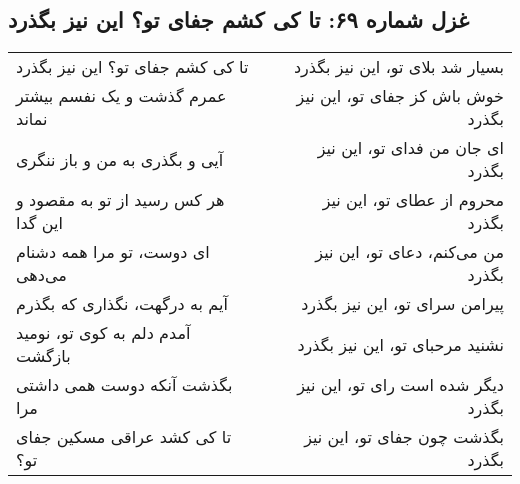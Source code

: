 \begin{center}
\section*{غزل شماره ۶۹: تا کی کشم جفای تو؟ این نیز بگذرد}
\label{sec:069}
\begin{longtable}{l p{0.5cm} r}
تا کی کشم جفای تو؟ این نیز بگذرد
&&
بسیار شد بلای تو، این نیز بگذرد
\\
عمرم گذشت و یک نفسم بیشتر نماند
&&
خوش باش کز جفای تو، این نیز بگذرد
\\
آیی و بگذری به من و باز ننگری
&&
ای جان من فدای تو، این نیز بگذرد
\\
هر کس رسید از تو به مقصود و این گدا
&&
محروم از عطای تو، این نیز بگذرد
\\
ای دوست، تو مرا همه دشنام می‌دهی
&&
من می‌کنم، دعای تو، این نیز بگذرد
\\
آیم به درگهت، نگذاری که بگذرم
&&
پیرامن سرای تو، این نیز بگذرد
\\
آمدم دلم به کوی تو، نومید بازگشت
&&
نشنید مرحبای تو، این نیز بگذرد
\\
بگذشت آنکه دوست همی داشتی مرا
&&
دیگر شده است رای تو، این نیز بگذرد
\\
تا کی کشد عراقی مسکین جفای تو؟
&&
بگذشت چون جفای تو، این نیز بگذرد
\\
\end{longtable}
\end{center}
